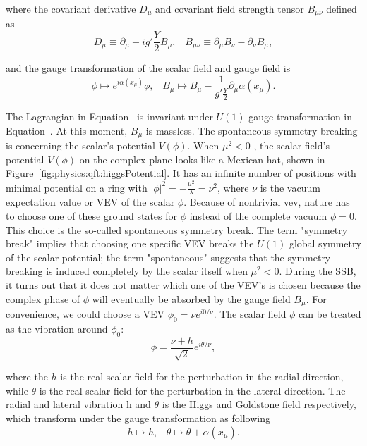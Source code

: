 \noindent where the covariant derivative $D_\mu$ and covariant field strength tensor $B_{\mu\nu}$ defined as
\begin{equation}
    D_\mu \equiv \partial_\mu +i g' \frac{Y}{2} B_\mu ,\;\;\; 
    B_{\mu\nu} \equiv  \partial_\mu B_\nu - \partial_\nu B_\mu,
\end{equation}

\noindent and the gauge transformation of the scalar field and gauge field is
\begin{equation}
	\phi \longmapsto e^{i\alpha(x_\mu)} \phi ,\;\;\; 
	B_\mu  \longmapsto  B_\mu - \frac{1}{g'\frac{Y}{2}}\partial_\mu \alpha(x_\mu).
    \label{eqn:physics:qft:u1HiggsGaugeTransform}
\end{equation}


\noindent The Lagrangian in Equation~\label{eqn:physics:qft:u1Higgs} is invariant under $U(1)$ gauge transformation in Equation~\label{eqn:physics:qft:u1HiggsGaugeTransform}. At this moment, $B_\mu$ is massless. The spontaneous symmetry breaking is concerning the scalar's potential $V(\phi)$. When $\mu^2<0$ , the scalar field's potential $V(\phi)$ on the complex plane looks like a Mexican hat, shown in Figure~\ref{fig:physics:qft:higgsPotential}. It has an infinite number of positions with minimal potential on a ring with $|\phi|^2 = -\frac{\mu^2}{\lambda} = \nu^2$, where $\nu$ is the vacuum expectation value or VEV of the scalar $\phi$. Because of nontrivial vev, nature has to choose one of these ground states for $\phi$ instead of the complete vacuum $\phi=0$. This choice is the so-called spontaneous symmetry break. The term "symmetry break" implies that choosing one specific VEV breaks the $U(1)$ global symmetry of the scalar potential; the term "spontaneous" suggests that the symmetry breaking is induced completely by the scalar itself when $\mu^2<0$. During the SSB, it turns out that it does not matter which one of the VEV's is chosen because the complex phase of $\phi$ will eventually be absorbed by the gauge field $B_\mu$. For convenience, we could choose a VEV $\phi_0 = \nu e^{i 0/\nu}$. The scalar field $\phi$ can be treated as the vibration around $\phi_0$:
\begin{equation}
    \phi = \frac{\nu + h}{\sqrt{2}}e^{i\theta/\nu}, 
\end{equation}

\noindent where the $h$ is the real scalar field for the perturbation in the radial direction, while $\theta$ is the real scalar field for the perturbation in the lateral direction. The radial and lateral vibration h and $\theta$ is the Higgs and Goldstone field respectively, which transform under the gauge transformation as following
\begin{equation}
    h  \longmapsto  h ,\;\;\; 
    \theta  \longmapsto  \theta + \alpha(x_\mu).
\end{equation}

